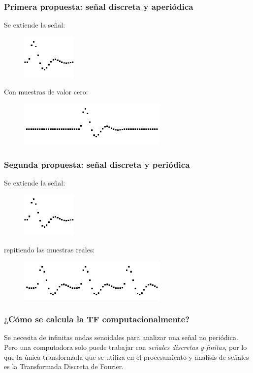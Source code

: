 \documentclass[12pt]{beamer}
\begin{document}
\begin{frame}
\frametitle{Primera propuesta: señal discreta y aperiódica}
Se extiende la señal:
\begin{figure}
    \centering
    \includegraphics[scale=0.9]{Imagenes/TDF_06.png}
\end{figure}
\pause
Con muestras de valor cero:
\begin{figure}
    \centering
    \includegraphics[scale=0.9]{Imagenes/TDF_03.png}
\end{figure}
\end{frame}
\begin{frame}
\frametitle{Segunda propuesta: señal discreta y periódica}
Se extiende la señal:
\begin{figure}
    \centering
    \includegraphics[scale=0.9]{Imagenes/TDF_06.png}
\end{figure}
\pause
repitiendo las muestras reales:
\begin{figure}
    \centering
    \includegraphics[scale=0.9]{Imagenes/TDF_04.png}
\end{figure}
\end{frame}
\begin{frame}
\frametitle{¿Cómo se calcula la TF computacionalmente?}
Se necesita de infinitas ondas senoidales para analizar una señal no periódica.
\\
\bigskip
\pause
Pero una computadora solo puede trabajar con \emph{señales discretas y finitas}, por lo que la única transformada que se utiliza en el procesamiento y análisis de señales es la Transformada Discreta de Fourier.
\end{frame}
\end{document}
